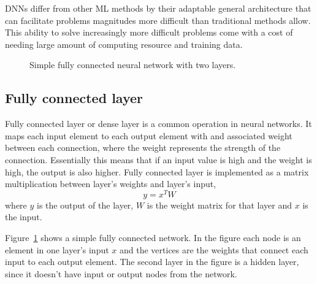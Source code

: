 \documentclass[12pt,a4paper,english
]{tunithesis}
\begin{document}
DNNs differ from other ML methods by their adaptable general architecture that can facilitate problems magnitudes more difficult than traditional methods allow. This ability to solve increasingly more difficult problems come with a cost of needing large amount of computing resource and training data.

\begin{figure}
\centering
{}
\caption{Simple fully connected neural network with two layers.}
\label{fig:fc-layer}
\end{figure}

\subsection{Fully connected layer}
Fully connected layer or dense layer is a common operation in neural networks. It maps each input element to each output element with and associated weight between each connection, where the weight represents the strength of the connection. Essentially this means that if an input value is high and the weight is high, the output is also higher.
Fully connected layer is implemented as a matrix multiplication between layer's weights and layer's input,
\begin{equation}
y = x^{T} W
\end{equation}
where $y$ is the output of the layer, $W$ is the weight matrix for that layer and $x$ is the input.

Figure~\ref{fig:fc-layer} shows a simple fully connected network. In the figure each node is an element in one layer's input $x$ and the vertices are the weights that connect each input to each output element. The second layer in the figure is a hidden layer, since it doesn't have input or output nodes from the network.
\end{document}
